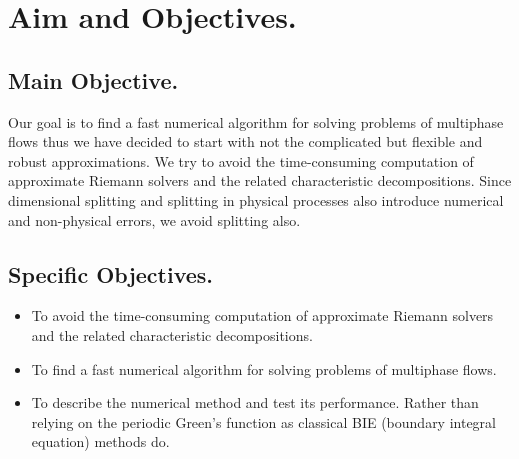 \documentclass[a4paper,12pt]{article}
\begin{document}
\section{Aim and Objectives.}
\subsection{Main Objective.}
Our goal is to find a fast numerical algorithm for solving problems of multiphase flows thus we have decided to start with not the complicated but flexible and robust approximations.
\newline We try to avoid the time-consuming computation of approximate Riemann solvers and the related characteristic decompositions. Since dimensional splitting and splitting in physical processes also introduce numerical and non-physical errors, we avoid splitting also. 
\subsection{Specific Objectives.}
\begin{itemize}
\item To avoid the time-consuming computation of approximate Riemann solvers and the related characteristic decompositions.
\item To find a fast numerical algorithm for solving problems of multiphase flows. 
\item To describe the numerical method and test its performance. Rather than relying on the periodic Green's function as classical BIE (boundary integral equation) methods do.
\end{itemize}


\end{document}
